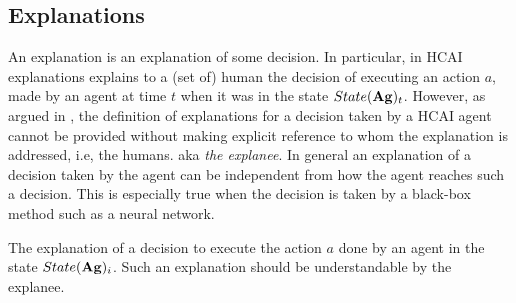 \subsection{Explanations} 
An explanation is an explanation of some decision. In particular, in
HCAI explanations explains to a (set of) human the decision of
executing an action $a$, made by an agent at time $t$ when it was in
the state $State(\mathbf{Ag})_t$. However, as argued in
\cite{miller2019explanation}, the definition of explanations for a
decision taken by a HCAI agent cannot be provided without making
explicit reference to whom the explanation is addressed, i.e, the
humans. aka \emph{the explanee}. 
In general an explanation of a decision taken by the agent can be
independent from how the agent reaches such a decision. This is
especially true when the decision is taken by a black-box method such
as a neural network. 

\begin{definition}[Explanation]
  The explanation of a decision to execute the action $a$ done by an
  agent in the state $State(\mathbf{Ag})_i$. Such an explanation should be
  understandable by the explanee.
\end{definition}


